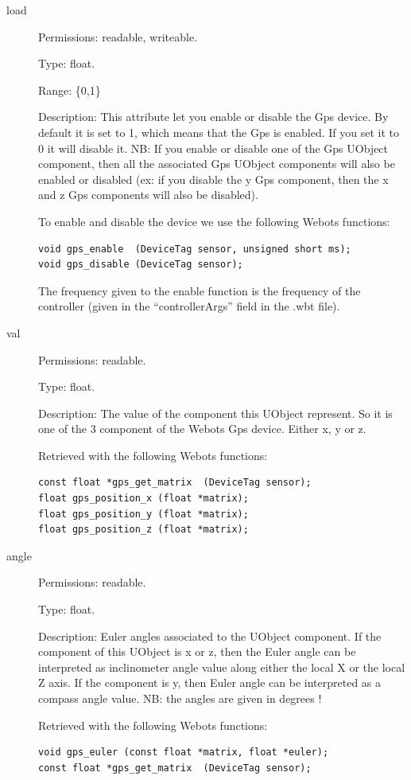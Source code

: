 \noindent
\begin{description}
\item[{load}]     Permissions: readable, writeable.


  Type: float.


  Range: \{0,1\}


  Description: This attribute let you enable or disable the Gps
  device.  By default it is set to 1, which means that the Gps is
  enabled. If you set it to 0 it will disable it. NB: If you enable or
  disable one of the Gps UObject component, then all the associated
  Gps UObject components will also be enabled or disabled (ex: if you
  disable the y Gps component, then the x and z Gps components will
  also be disabled).


  To enable and disable the device we use the following Webots
  functions:


\begin{lstlisting}
void gps_enable  (DeviceTag sensor, unsigned short ms);
void gps_disable (DeviceTag sensor);
\end{lstlisting}

The frequency given to the enable function is the frequency of the
\urbi controller (given in the ``controllerArgs'' field in the .wbt
file).

\item[{         val
 }]            Permissions: readable.


 Type: float.


 Description: The value of the component this UObject represent. So it
 is one of the 3 component of the Webots Gps device. Either x, y or z.


 Retrieved with the following Webots functions:


\begin{lstlisting}
const float *gps_get_matrix  (DeviceTag sensor);
float gps_position_x (float *matrix);
float gps_position_y (float *matrix);
float gps_position_z (float *matrix);
\end{lstlisting}
\item[{         angle
 }]            Permissions: readable.


 Type: float.


 Description: Euler angles associated to the UObject component. If the
 component of this UObject is x or z, then the Euler angle can be
 interpreted as inclinometer angle value along either the local X or
 the local Z axis. If the component is y, then Euler angle can be
 interpreted as a compass angle value. NB: the angles are given in
 degrees !


          Retrieved with the following Webots functions:


\begin{lstlisting}
void gps_euler (const float *matrix, float *euler);
const float *gps_get_matrix  (DeviceTag sensor);
\end{lstlisting}
\end{description}

